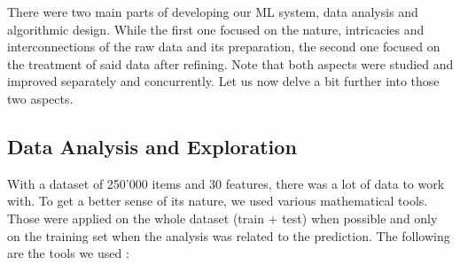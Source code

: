 \documentclass[10pt,conference,compsocconf]{IEEEtran}
\begin{document}
There were two main parts of developing our ML system, data analysis and algorithmic design. While the first one focused on the nature, intricacies and interconnections of the raw data and its preparation, the second one focused on the treatment of said data after refining. Note that both aspects were studied and improved separately and concurrently.  Let us now delve a bit further into those two aspects.

\subsection{Data Analysis and Exploration}
With a dataset of 250'000 items and 30 features, there was a lot of data to work with. To get a better sense of its nature, we used various mathematical tools. Those were applied on the whole dataset (train + test) when possible and only on the training set when the analysis was related to the prediction. The following are the tools we used :
\end{document}
